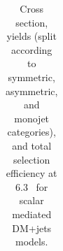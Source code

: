 \begin{table}
{\begin{tabular}{rrlrrrrr}
    \hline\hline
    \end{tabular}
    }
    \caption{Cross section, yields (split according to symmetric, asymmetric, 
        and monojet categories), and total selection efficiency at $6.3$~\ifb 
        for scalar mediated DM+jets models.}
    \label{tab:DMS_yld}
\end{table}

